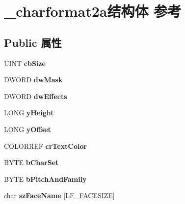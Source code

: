 \hypertarget{struct__charformat2a}{}\section{\+\_\+charformat2a结构体 参考}
\label{struct__charformat2a}
\subsection*{Public 属性}
\begin{DoxyCompactItemize}
\item 
\mbox{\label{struct__charformat2a_a53976304d4f2904b4deb65f460b36257}} 
U\+I\+NT {\bfseries cb\+Size}
\item 
\mbox{\label{struct__charformat2a_a0d3c4079c7cf0ec09bca328da1edaa02}} 
D\+W\+O\+RD {\bfseries dw\+Mask}
\item 
\mbox{\label{struct__charformat2a_aa8489fd465d2861b56f14006705279d1}} 
D\+W\+O\+RD {\bfseries dw\+Effects}
\item 
\mbox{\label{struct__charformat2a_a476f9bd24629dee3fb59f157f24a26bf}} 
L\+O\+NG {\bfseries y\+Height}
\item 
\mbox{\label{struct__charformat2a_a8074be095a8c008f967360a48e0c4f86}} 
L\+O\+NG {\bfseries y\+Offset}
\item 
\mbox{\label{struct__charformat2a_a0bf32fb493af266ead84d0f0775f1910}} 
C\+O\+L\+O\+R\+R\+EF {\bfseries cr\+Text\+Color}
\item 
\mbox{\label{struct__charformat2a_ac6beadf6e402babc2d5d93ed45946f0f}} 
B\+Y\+TE {\bfseries b\+Char\+Set}
\item 
\mbox{\label{struct__charformat2a_a0833ae111f86c1898c0924581993e41b}} 
B\+Y\+TE {\bfseries b\+Pitch\+And\+Family}
\item 
\mbox{\label{struct__charformat2a_a5996367c07809bf7531221913fff5e87}} 
char {\bfseries sz\+Face\+Name} \mbox{[}L\+F\+\_\+\+F\+A\+C\+E\+S\+I\+ZE\mbox{]}

\end{DoxyCompactItemize}

